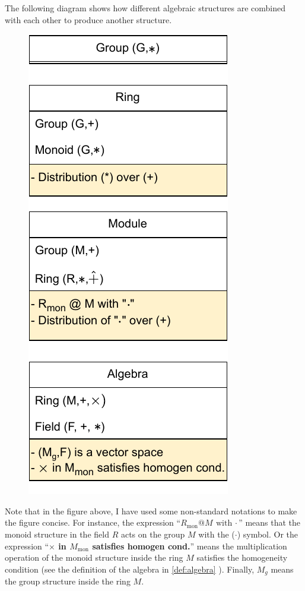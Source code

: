 The following diagram shows how different algebraic structures are combined with each other to produce another structure.


\begin{figure}[h!]
	\centering
	\includegraphics[scale=0.5]{Images/algebraicStructures.pdf}
\end{figure}
\FloatBarrier
Note that in the figure above, I have used some non-standard notations to make the figure concise. For instance, the expression ``\textbf{$ R_{\text{mon}} @ M \ \text{with $\cdot$}$}'' means that the monoid structure in the field $ R $ acts on the group $ M $ with the ($ \cdot $) symbol. Or the expression ``\textbf{$ \times $ in $ M_{\text{mon}} $ satisfies homogen cond.}'' means the multiplication operation of the monoid structure inside the ring $ M $ satisfies the homogeneity condition (see the definition of the algebra in \autoref{def:algebra} ). Finally, $ M_{g} $ means the group structure inside the ring $ M $.


